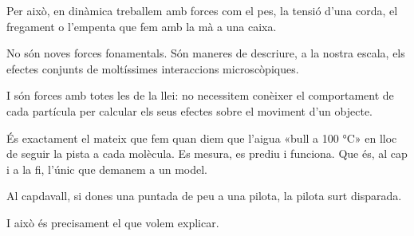 Per això, en dinàmica treballem amb forces com el pes, la tensió d'una corda, el fregament o l'empenta que fem amb la mà a una caixa.

No són noves forces fonamentals. Són maneres de descriure, a la nostra escala, els efectes conjunts de moltíssimes interaccions microscòpiques.

I són forces amb totes les de la llei: no necessitem conèixer el comportament de cada partícula per calcular els seus efectes sobre el moviment d'un objecte.

És exactament el mateix que fem quan diem que l'aigua «bull a 100 °C» en lloc de seguir la pista a cada molècula. Es mesura, es prediu i funciona. Que és, al cap i a la fi, l'únic que demanem a un model.

Al capdavall, si dones una puntada de peu a una pilota, la pilota surt disparada.

I això és precisament el que volem explicar.
